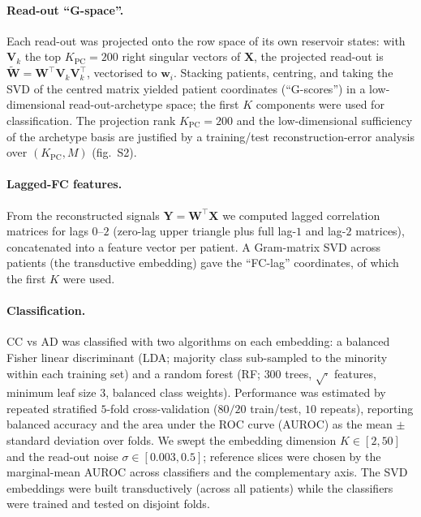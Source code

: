 \documentclass[11pt]{article}
\begin{document}
\paragraph{Read-out ``G-space''.}
Each read-out was projected onto the row space of its own reservoir states:
with $\mathbf{V}_{k}$ the top $K_{\mathrm{PC}}=200$ right singular vectors of
$\mathbf{X}$, the projected read-out is
$\widetilde{\mathbf{W}}=\mathbf{W}^{\!\top}\mathbf{V}_{k}\mathbf{V}_{k}^{\!\top}$,
vectorised to $\mathbf{w}_i$. Stacking patients, centring, and taking the SVD
of the centred matrix yielded patient coordinates (``G-scores'') in a
low-dimensional read-out-archetype space; the first $K$ components were used for
classification. The projection rank $K_{\mathrm{PC}}=200$ and the
low-dimensional sufficiency of the archetype basis are justified by a
training/test reconstruction-error analysis over $(K_{\mathrm{PC}},M)$
(fig.~S2).

\paragraph{Lagged-FC features.}
From the reconstructed signals $\mathbf{Y}=\mathbf{W}^{\!\top}\mathbf{X}$ we
computed lagged correlation matrices for lags $0$--$2$ (zero-lag upper triangle
plus full lag-$1$ and lag-$2$ matrices), concatenated into a feature vector per
patient. A Gram-matrix SVD across patients (the transductive embedding) gave the
``FC-lag'' coordinates, of which the first $K$ were used.

\paragraph{Classification.}
CC vs AD was classified with two algorithms on each embedding: a balanced
Fisher linear discriminant (LDA; majority class sub-sampled to the minority
within each training set) and a random forest (RF; $300$ trees, $\sqrt{\cdot}$
features, minimum leaf size $3$, balanced class weights). Performance was
estimated by repeated stratified $5$-fold cross-validation ($80/20$ train/test,
$10$ repeats), reporting balanced accuracy and the area under the ROC curve
(AUROC) as the mean $\pm$ standard deviation over folds. We swept the embedding
dimension $K\in[2,50]$ and the read-out noise $\sigma\in[0.003,0.5]$; reference
slices were chosen by the marginal-mean AUROC across classifiers and the
complementary axis. The SVD embeddings were built transductively (across all
patients) while the classifiers were trained and tested on disjoint folds.
\end{document}
